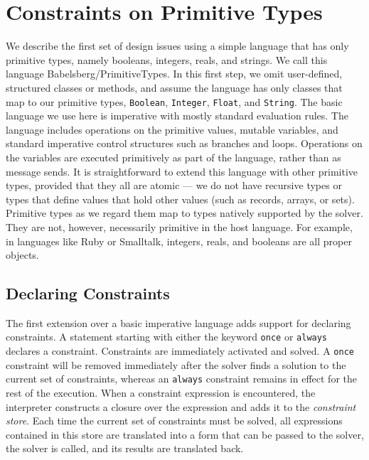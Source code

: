 



\section{Constraints on Primitive Types}
\label{sec:primitive-objects}

We describe the first set of design issues using a simple language
that has only primitive types, namely booleans, integers, reals, and
strings. We call this language Babelsberg/PrimitiveTypes. In this
first step, we omit user-defined, structured classes or methods, and
assume the language has only classes that map to our primitive types,
\ie \lstinline|Boolean|, \lstinline|Integer|, \lstinline|Float|, and
\lstinline|String|. The basic language we use here is imperative with
mostly standard evaluation rules.  The language includes operations on
the primitive values, mutable variables, and standard imperative
control structures such as branches and loops. Operations on the
variables are executed primitively as part of the language, rather
than as message sends. It is straightforward to extend this language
with other primitive types, provided that they all are atomic --- we
do not have recursive types or types that define values that hold other
values (such as records, arrays, or sets). Primitive types as we
regard them map to types natively supported by the solver. They are
not, however, necessarily primitive in the host language. For example,
in languages like Ruby or Smalltalk, integers, reals, and booleans are
all proper objects.

\subsection{Declaring Constraints}
\label{sec:decl-constr}
The first extension over a basic imperative language adds support for declaring
constraints. A statement starting with either the keyword \lstinline|once| or
\lstinline|always| declares a constraint. Constraints are immediately activated
and solved. A \lstinline|once| constraint will be removed immediately after the
solver finds a solution to the current set of constraints, whereas an
\lstinline|always| constraint remains in effect for the rest of the
execution. When a constraint expression is encountered, the interpreter
constructs a closure over the expression and adds it to the \emph{constraint
  store}. Each time the current set of constraints must be solved, all
expressions contained in this store are translated into a form that can be
passed to the solver, the solver is called, and its results are translated back.

